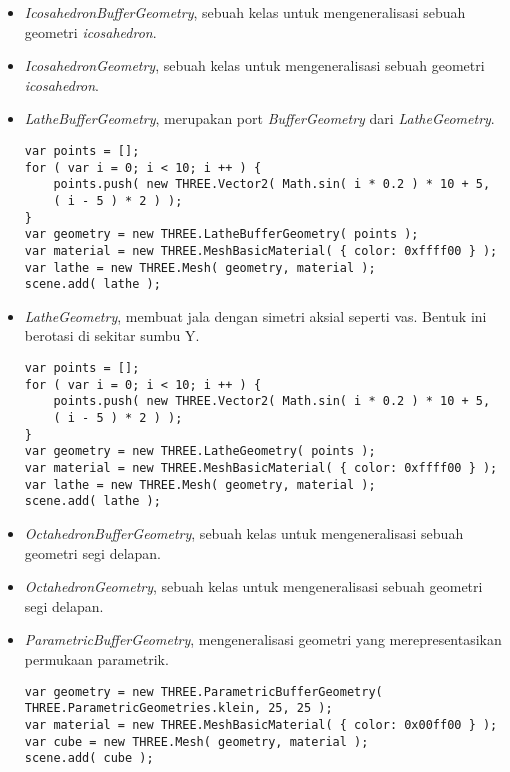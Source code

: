 \begin{itemize}
\begin{itemize}
	\item {\it IcosahedronBufferGeometry}, sebuah kelas untuk mengeneralisasi sebuah geometri {\it icosahedron}.

	\item {\it IcosahedronGeometry}, sebuah kelas untuk mengeneralisasi sebuah geometri {\it icosahedron}.

	\item {\it LatheBufferGeometry}, merupakan port {\it BufferGeometry} dari {\it LatheGeometry}.
	
\begin{lstlisting}
var points = [];
for ( var i = 0; i < 10; i ++ ) {
	points.push( new THREE.Vector2( Math.sin( i * 0.2 ) * 10 + 5,
	( i - 5 ) * 2 ) );
}
var geometry = new THREE.LatheBufferGeometry( points );
var material = new THREE.MeshBasicMaterial( { color: 0xffff00 } );
var lathe = new THREE.Mesh( geometry, material );
scene.add( lathe );
\end{lstlisting}

	\item {\it LatheGeometry}, membuat jala dengan simetri aksial seperti vas. Bentuk ini berotasi di sekitar sumbu Y.
	
\begin{lstlisting}
var points = [];
for ( var i = 0; i < 10; i ++ ) {
	points.push( new THREE.Vector2( Math.sin( i * 0.2 ) * 10 + 5,
	( i - 5 ) * 2 ) );
}
var geometry = new THREE.LatheGeometry( points );
var material = new THREE.MeshBasicMaterial( { color: 0xffff00 } );
var lathe = new THREE.Mesh( geometry, material );
scene.add( lathe );
\end{lstlisting}

	\item {\it OctahedronBufferGeometry}, sebuah kelas untuk mengeneralisasi sebuah geometri segi delapan.
	
	\item {\it OctahedronGeometry}, sebuah kelas untuk mengeneralisasi sebuah geometri segi delapan.
	
	\item {\it ParametricBufferGeometry}, mengeneralisasi geometri yang merepresentasikan permukaan parametrik.
	
\begin{lstlisting}
var geometry = new THREE.ParametricBufferGeometry( 
THREE.ParametricGeometries.klein, 25, 25 );
var material = new THREE.MeshBasicMaterial( { color: 0x00ff00 } );
var cube = new THREE.Mesh( geometry, material );
scene.add( cube );
\end{lstlisting}


\end{itemize}
\end{itemize}
